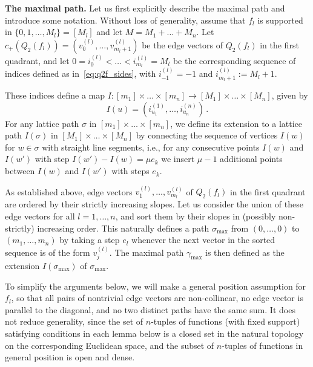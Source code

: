 \documentclass[a4paper,reqno,12pt]{amsart}
\newcommand{\1}{\bo{1}}
\begin{document}
\textbf{The maximal path.} Let us first explicitly describe the maximal path and introduce some notation. Without loss of generality, assume that $f_l$ is supported in $\{0,1,\dots,M_l\}=[M_l]$ and let $M=M_1+\dots+M_n$. Let $c_+(Q_2(f_l)) = (v_0^{(l)},\dots,v_{m_l+1}^{(l)})$ be the edge vectors of $Q_2(f_l)$ in the first quadrant, and let $0=i_0^{(l)}<\dots<i_{m_l}^{(l)}=M_l$ be the corresponding sequence of indices defined as in~\eqref{eq:q2f_sides}, with $i_{-1}^{(l)}=-1$ and $i_{m_l+1}^{(l)}:=M_l+1$.

These indices define a map $I\colon [m_1]\times \dots \times [m_n]\to [M_1]\times \dots \times [M_n]$, given by
	\[I(u) = (i_{u_1}^{(1)}, \dots, i_{u_n}^{(n)})\,.\]
For any lattice path $\sigma$ in $[m_1]\times \dots \times [m_n]$, we define its extension to a lattice path $I(\sigma)$ in $[M_1]\times \dots \times [M_n]$ by connecting the sequence of vertices $I(w)$ for $w \in \sigma$ with straight line segments, i.e., for any consecutive points $I(w)$ and $I(w')$ with step $I(w')-I(w)=\mu e_k$ we insert $\mu-1$ additional points between $I(w)$ and $I(w')$ with steps $e_k$.

As established above, edge vectors $v_1^{(l)},\dots,v_{m_l}^{(l)}$ of $Q_2(f_l)$ in the first quadrant are ordered by their strictly increasing slopes. Let us consider the union of these edge vectors for all $l=1,\dots,n$, and sort them by their slopes in (possibly non-strictly) increasing order. This naturally defines a path $\sigma_{\mathrm{max}}$ from $(0,\dots,0)$ to $(m_1,\dots,m_n)$ by taking a step $e_l$ whenever the next vector in the sorted sequence is of the form $v_j^{(l)}$. The maximal path $\gamma_{\mathrm{max}}$ is then defined as the extension $I(\sigma_{\mathrm{max}})$ of $\sigma_{\mathrm{max}}$.

To simplify the arguments below, we will make a general position assumption for $f_l$, so that all pairs of nontrivial edge vectors are non-collinear, no edge vector is parallel to the diagonal, and no two distinct paths have the same sum. It does not reduce generality, since the set of $n$-tuples of functions (with fixed support) satisfying conditions in each lemma below is a closed set in the natural topology on the corresponding Euclidean space, and the subset of $n$-tuples of functions in general position is open and dense.
\end{document}
